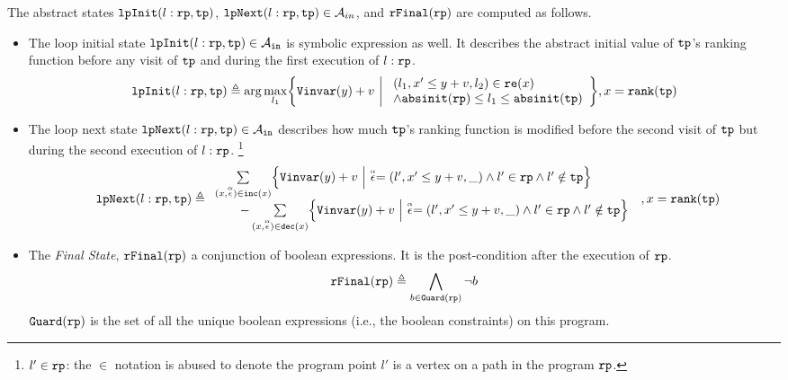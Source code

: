 \begin{defn}
\label{def:alg-absstate}
The abstract states ${\mathtt{lpInit}}(l: {\mathtt{rp}}, {\mathtt{tp}})$, ${\mathtt{lpNext}}(l: {\mathtt{rp}}, {\mathtt{tp}}) \in \mathcal{A}_{in}$,
and ${\mathtt{rFinal}}({\mathtt{rp}})$ are computed as follows.
\begin{itemize}
   \item 
The loop initial state 
${\mathtt{lpInit}}(l: {\mathtt{rp}}, {\mathtt{tp}}) \in \mathcal{A}_{{\mathtt{in}}}$ is symbolic expression as well. 
It describes the abstract initial value of ${\mathtt{tp}}$'s ranking function before
any visit of ${\mathtt{tp}}$ and during the first execution of $l: {\mathtt{rp}}$.
\[
  \lpinit(l: \rprog, \tpath) \triangleq 
  \arg\max_{l_1}\left\{
       \varinvar(y) + v ~\middle\vert~ 
       \begin{array}{l} 
         (l_1, x' \leq y + v, l_2) \in \reset(x) 
         \\
         \land \absinit(\rprog) \leq l_1 \leq \absinit(\tpath)
       \end{array}
     \right\}
    , x = \locbound(\tpath)
  \]
\item
The loop next state 
${\mathtt{lpNext}}(l: {\mathtt{rp}}, {\mathtt{tp}}) \in \mathcal{A}_{{\mathtt{in}}}$ 
describes how much ${\mathtt{tp}}$'s ranking function
is modified before
the second visit of ${\mathtt{tp}}$ but during the second execution of $l: {\mathtt{rp}}$.
\footnote{$l' \in {\mathtt{rp}}$: the $\in$ notation is abused to denote
the program point $l'$ is a vertex on a path in the program ${\mathtt{rp}}$.}
%
\[
  \begin{array}{l}
  \lpnext(l: \rprog, \tpath) \triangleq 
    \begin{array}{l}
  \sum\limits_{(x, \absevent) \in \inc(x) }
  \left\{ 
    \varinvar(y) + v ~\middle\vert~ \absevent = (l', x' \leq y + v, \_) \land  l' \in \rprog 
    \land l' \notin \tpath \right\}
    \\ \qquad 
    - \sum\limits_{(x, \absevent) \in \dec(x) }\left\{ 
      \varinvar(y) + v 
      ~\middle\vert~ \absevent = (l', x' \leq y + v, \_) \land l' \in \rprog \land l' \notin \tpath \right\}
    \end{array}
  \end{array}
  , x = \locbound(\tpath)
  \]
  \item  The \emph{Final State}, ${\mathtt{rFinal}}({\mathtt{rp}})$ a conjunction of boolean expressions.
  It is the post-condition
  after the execution of ${\mathtt{rp}}$.
\[
    {\mathtt{rFinal}}({\mathtt{rp}}) \triangleq 
    \bigwedge_{b \in {\mathtt{Guard}}({\mathtt{rp}})}
    \neg b
\]
   ${\mathtt{Guard}}({\mathtt{rp}})$ is the set of all the unique boolean expressions (i.e., the boolean constraints) on this program.
\end{itemize}
\end{defn}

